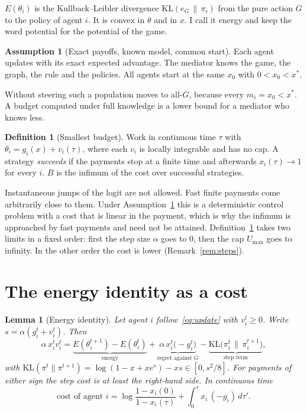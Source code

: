 \documentclass[11pt,a4paper]{article}
\theoremstyle{definition}
\newtheorem{definition}{Definition}
\newtheorem{assumption}{Assumption}
\theoremstyle{plain}
\newtheorem{lemma}{Lemma}
\newcommand{\Binf}{B}
\newcommand{\xs}{x^{*}}
\newcommand{\KL}{\mathrm{KL}}
\begin{document}
$E(\theta_i)$ is the Kullback--Leibler divergence $\KL(e_G\,\|\,\pi_i)$ from the pure action $G$ to the policy of agent $i$. It is convex in $\theta$ and in $x$. I call it energy and keep the word potential for the potential of the game.

\begin{assumption}[Exact payoffs, known model, common start]\label{as:all}
Each agent updates with its exact expected advantage. The mediator knows the game, the graph, the rule and the policies. All agents start at the same $x_0$ with $0<x_0<\xs$.
\end{assumption}

Without steering such a population moves to all-$G$, because every $m_i=x_0<\xs$. A budget computed under full knowledge is a lower bound for a mediator who knows less.

\begin{definition}[Smallest budget]\label{def:bmin}
Work in continuous time $\tau$ with $\dot\theta_i=g_i(x)+v_i(\tau)$, where each $v_i$ is locally integrable and has no cap. A strategy \emph{succeeds} if the payments stop at a finite time and afterwards $x_i(\tau)\to1$ for every $i$. $\Binf$ is the infimum of the cost over successful strategies.
\end{definition}

Instantaneous jumps of the logit are not allowed. Fast finite payments come arbitrarily close to them. Under Assumption~\ref{as:all} this is a deterministic control problem with a cost that is linear in the payment, which is why the infimum is approached by fast payments and need not be attained. Definition~\ref{def:bmin} takes two limits in a fixed order: first the step size $\alpha$ goes to $0$, then the cap $U_{\max}$ goes to infinity. In the other order the cost is lower (Remark~\ref{rem:steps}).

\section{The energy identity as a cost}\label{sec:identity}

\begin{lemma}[Energy identity]\label{lem:identity}
Let agent $i$ follow~\eqref{eq:update} with $v_i^t\ge0$. Write $s=\alpha(g_i^t+v_i^t)$. Then
\begin{equation}\label{eq:identity}
\alpha\,x_i^tv_i^t
=\underbrace{E(\theta_i^{t+1})-E(\theta_i^{t})}_{\text{energy}}
+\underbrace{\alpha\,x_i^t\bigl(-g_i^t\bigr)}_{\text{regret against }G}
-\underbrace{\KL\bigl(\pi_i^t\,\|\,\pi_i^{t+1}\bigr)}_{\text{step term}},
\end{equation}
with $\KL(\pi^t\|\pi^{t+1})=\log(1-x+xe^{s})-xs\in[0,s^2/8]$. For payments of either sign the step cost is at least the right-hand side. In continuous time
\begin{equation}\label{eq:identity-ct}
\text{cost of agent }i=\log\frac{1-x_i(0)}{1-x_i(\tau)}+\int_0^{\tau}x_i\,(-g_i)\,d\tau' .
\end{equation}
\end{lemma}
\end{document}
